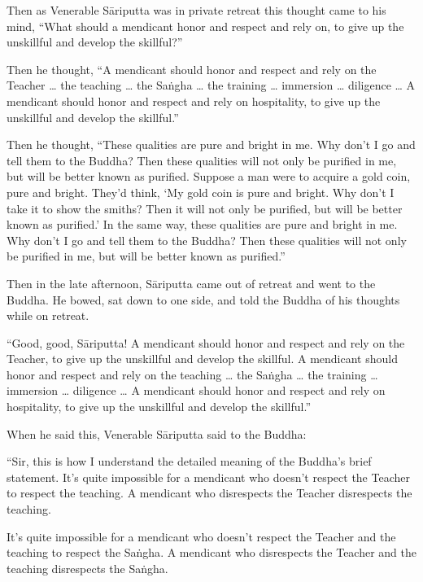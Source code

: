 \documentclass[12pt,openany]{book}%
\begin{document}
Then as Venerable \textsanskrit{Sāriputta} was in private retreat this thought came to his mind, “What should a mendicant honor and respect and rely on, to give up the unskillful and develop the skillful?” 

Then he thought, “A mendicant should honor and respect and rely on the Teacher … the teaching … the \textsanskrit{Saṅgha} … the training … immersion … diligence … A mendicant should honor and respect and rely on hospitality, to give up the unskillful and develop the skillful.” 

Then he thought, “These qualities are pure and bright in me. Why don’t I go and tell them to the Buddha? Then these qualities will not only be purified in me, but will be better known as purified. Suppose a man were to acquire a gold coin, pure and bright. They’d think, ‘My gold coin is pure and bright. Why don’t I take it to show the smiths? Then it will not only be purified, but will be better known as purified.’ In the same way, these qualities are pure and bright in me. Why don’t I go and tell them to the Buddha? Then these qualities will not only be purified in me, but will be better known as purified.” 

Then in the late afternoon, \textsanskrit{Sāriputta} came out of retreat and went to the Buddha. He bowed, sat down to one side, and told the Buddha of his thoughts while on retreat. 

“Good, good, \textsanskrit{Sāriputta}! A mendicant should honor and respect and rely on the Teacher, to give up the unskillful and develop the skillful. A mendicant should honor and respect and rely on the teaching … the \textsanskrit{Saṅgha} … the training … immersion … diligence … A mendicant should honor and respect and rely on hospitality, to give up the unskillful and develop the skillful.” 

When he said this, Venerable \textsanskrit{Sāriputta} said to the Buddha: 

“Sir, this is how I understand the detailed meaning of the Buddha’s brief statement. It’s quite impossible for a mendicant who doesn’t respect the Teacher to respect the teaching. A mendicant who disrespects the Teacher disrespects the teaching. 

It’s quite impossible for a mendicant who doesn’t respect the Teacher and the teaching to respect the \textsanskrit{Saṅgha}. A mendicant who disrespects the Teacher and the teaching disrespects the \textsanskrit{Saṅgha}. 
\end{document}

